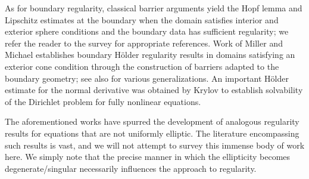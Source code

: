 \documentclass[12pt]{amsart}
\begin{document}
As for boundary regularity, classical barrier arguments yield the Hopf lemma and Lipschitz estimates at the boundary when the domain satisfies interior and exterior sphere conditions and the boundary data has sufficient regularity; we refer the reader to the survey \cite{ApushkinskayaNazarovSurvey} for appropriate references. Work of Miller \cite{Miller67} and Michael \cite{
Michael81} establishes boundary H\"older regularity results in domains satisfying an exterior cone condition through the construction of barriers adapted to the boundary geometry; see also \cite{ChoSafonov, Safonov2018} for various generalizations. An important H\"older estimate for the normal derivative was obtained by Krylov \cite{Krylov83} to establish solvability of the Dirichlet problem for fully nonlinear equations.

The aforementioned works have spurred the development of analogous regularity results for equations that are not uniformly elliptic. The literature encompassing such results is vast, and we will not attempt to survey this immense body of work here. We simply note that the precise manner in which the ellipticity becomes degenerate/singular necessarily influences the approach to regularity.
\end{document}
